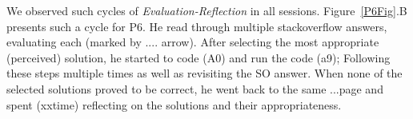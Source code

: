 We observed such cycles of \textit{Evaluation-Reflection} in all sessions. Figure~\ref{P6Fig}.B presents such a cycle for P6. He read through multiple stackoverflow answers, evaluating each (marked by .... arrow). After selecting the most appropriate (perceived) solution, he started to code (A0) and run the code (a9); Following these steps multiple times as well as revisiting the SO answer. When none of the selected solutions proved to be correct, he went back to the same ...page and spent (xxtime) reflecting on the solutions and their appropriateness.





